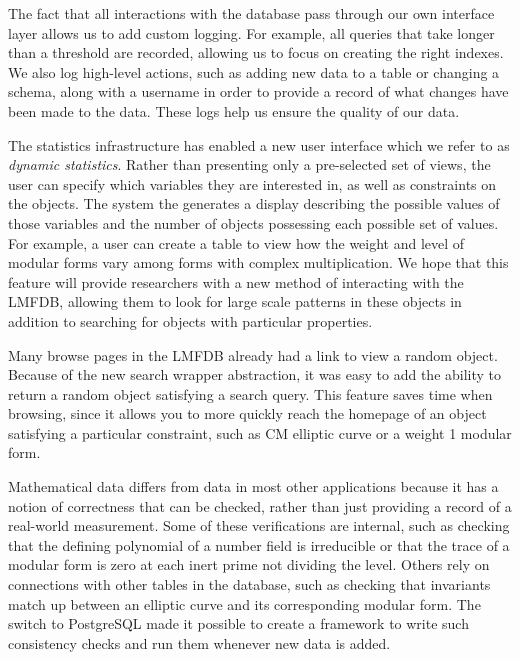 \documentclass{article}
\begin{document}
The fact that all interactions with the database pass through our own interface layer allows us to add custom logging.
For example, all queries that take longer than a threshold are recorded, allowing us to focus on creating the right indexes.
We also log high-level actions, such as adding new data to a table or changing a schema, along with a username in order to provide a record of what changes have been made to the data.
These logs help us ensure the quality of our data.

The statistics infrastructure has enabled a new user interface which we refer to as \emph{dynamic statistics}.
Rather than presenting only a pre-selected set of views, the user can specify which variables they are interested in, as well as constraints on the objects.
The system the generates a display describing the possible values of those variables and the number of objects possessing each possible set of values.
For example, a user can create a table to view how the weight and level of modular forms vary among forms with complex multiplication.
We hope that this feature will provide researchers with a new method of interacting with the LMFDB, allowing them to look for large scale patterns in these objects in addition to searching for objects with particular properties.

Many browse pages in the LMFDB already had a link to view a random object.
Because of the new search wrapper abstraction, it was easy to add the ability to return a random object satisfying a search query.
This feature saves time when browsing, since it allows you to more quickly reach the homepage of an object satisfying a particular constraint, such as CM elliptic curve or a weight 1 modular form.

Mathematical data differs from data in most other applications because it has a notion of correctness that can be checked, rather than just providing a record of a real-world measurement.
Some of these verifications are internal, such as checking that the defining polynomial of a number field is irreducible or that the trace of a modular form is zero at each inert prime not dividing the level.
Others rely on connections with other tables in the database, such as checking that invariants match up between an elliptic curve and its corresponding modular form.
The switch to PostgreSQL made it possible to create a framework to write such consistency checks and run them whenever new data is added.



\end{document}
